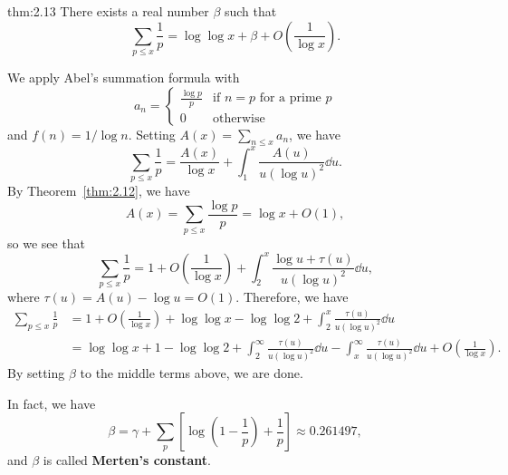 \begin{theo}[Merten]{thm:2.13}
There exists a real number $\beta$ such that 
\[ \sum_{p \leq x} \frac1p = \log\log x + \beta + O\left(\frac1{\log x}\right). \]
\end{theo}
\begin{pf}
We apply Abel's summation formula with 
\[ a_n = \begin{cases} \frac{\log p}p & \text{if $n = p$ for a prime $p$} \\ 0 & \text{otherwise} \end{cases} \]
and $f(n) = 1/\log n$. Setting $A(x) = \sum_{n\leq x} a_n$, we have 
\[ \sum_{p \leq x} \frac1p = \frac{A(x)}{\log x} + 
\int_1^x \frac{A(u)}{u(\log u)^2}\dd u. \]
By Theorem~\ref{thm:2.12}, we have 
\[ A(x) = \sum_{p\leq x} \frac{\log p}p = \log x + O(1), \]
so we see that 
\[ \sum_{p\leq x} \frac1p = 1 + O\left(\frac1{\log x}\right)
+ \int_2^x \frac{\log u + \tau(u)}{u(\log u)^2}\dd u, \]
where $\tau(u) = A(u) - \log u = O(1)$. Therefore, we have 
\begin{align*}
    \sum_{p\leq x} \frac1p 
    &= 1 + O\left( \frac1{\log x} \right) + \log\log x 
    - \log\log 2 + \int_2^x \frac{\tau(u)}{u(\log u)^2}\dd u \\
    &= \log\log x + 1 - \log\log 2 + \int_2^\infty 
    \frac{\tau(u)}{u(\log u)^2}\dd u - 
    \int_x^\infty \frac{\tau(u)}{u(\log u)^2}\dd u + 
    O \left( \frac1{\log x} \right). 
\end{align*}
By setting $\beta$ to the middle terms above, we are done.
\end{pf}

In fact, we have 
\[ \beta = \gamma + \sum_p \left[ \log \left( 1 - \frac1p \right) + \frac1p \right] \approx 0.261497, \]
and $\beta$ is called {\bf Merten's constant}.